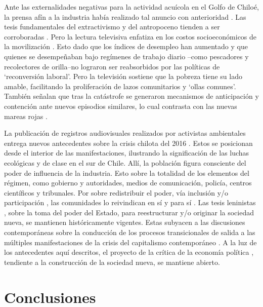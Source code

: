 \documentclass{textolivre}
\begin{document}
Ante las externalidades negativas para la actividad acuícola en el Golfo de Chiloé,
la prensa afín a la industria había realizado tal anuncio con anterioridad \cite{gonzalez2016,infante2016,salmonexpert}.
Las tesis fundamentales del
extractivismo y del antropoceno tienden a ser corroboradas \cite{Foster2016,Gunderson2019}.
Pero la lectura televisiva enfatiza en los
costos socioeconómicos de la movilización \cite{24horasc}. Esto dado que los índices
de desempleo han aumentado y que quienes se desempeñaban bajo regímenes de
trabajo diario --como pescadores y recolectores de orilla--no lograron ser reabsorbidos
por las políticas de ‘reconversión laboral’. Pero la televisión sostiene que la pobreza tiene
su lado amable, facilitando la proliferación de lazos comunitarios y ‘ollas comunes’.
También señalan que tras la catástrofe se generaron mecanismos de anticipación y
contención ante nuevos episodios similares, lo cual contrasta con las nuevas mareas rojas
\cite{galaz2016,Kamjunke2017}.

La publicación de registros audiovisuales realizados por activistas ambientales
entrega nuevos antecedentes sobre la crisis chilota del 2016 \cite{quense}. Estos se
posicionan desde el interior de las manifestaciones, ilustrando la significación de las
luchas ecológicas y de clase en el sur de Chile. Allí, la población figura consciente del
poder de influencia de la industria. Esto sobre la totalidad de los elementos del régimen,
como gobierno y autoridades, medios de comunicación, policía, centros científicos y
tribunales. Por sobre redistribuir el poder, vía inclusión y/o participación \cite{Folke2016,Mascareo2018b}, 
las comunidades lo reivindican en sí y para sí \cite{marx2003}. Las tesis leninistas \cite{lenin1997}, sobre la toma del poder del Estado, para
reestructurar y/o originar la sociedad nueva, se mantienen históricamente vigentes. Estas
subyacen a las discusiones contemporáneas sobre la conducción de los procesos
transicionales de salida a las múltiples manifestaciones de la crisis del capitalismo
contemporáneo \cite{arboleda}. A la luz de los antecedentes aquí descritos, el
proyecto de la crítica de la economía política \cite{marx2010}, tendiente a la construcción
de la sociedad nueva, se mantiene abierto.



\section{Conclusiones}\label{sec-conclusiones}
\end{document}
